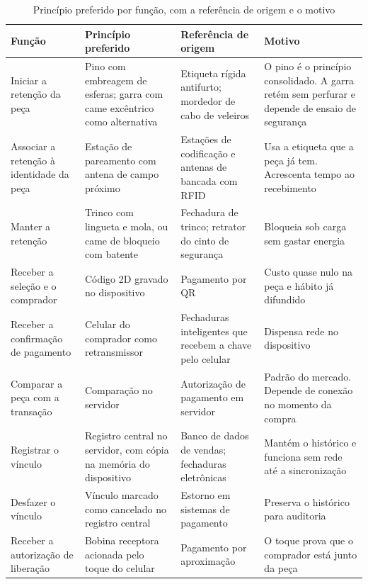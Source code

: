 \begin{table}[p]
    \centering
    \caption{Princípio preferido por função, com a referência de origem e o motivo}
    \label{tab:aprov_sintese}
    \scriptsize
    \setlength{\tabcolsep}{4pt}
    \renewcommand{\arraystretch}{1.25}
    \begin{tabularx}{\textwidth}{@{}
        >{\RaggedRight\arraybackslash}p{2.9cm}
        >{\RaggedRight\arraybackslash}p{3.6cm}
        >{\RaggedRight\arraybackslash}p{3.2cm}
        >{\RaggedRight\arraybackslash}X@{}}
        \toprule
        \textbf{Função} & \textbf{Princípio preferido} & \textbf{Referência de origem} & \textbf{Motivo} \\
        \midrule
        Iniciar a retenção da peça & Pino com embreagem de esferas; garra com came excêntrico como alternativa & Etiqueta rígida antifurto; mordedor de cabo de veleiros & O pino é o princípio consolidado. A garra retém sem perfurar e depende de ensaio de segurança \\
        Associar a retenção à identidade da peça & Estação de pareamento com antena de campo próximo & Estações de codificação e antenas de bancada com RFID & Usa a etiqueta que a peça já tem. Acrescenta tempo ao recebimento \\
        Manter a retenção & Trinco com lingueta e mola, ou came de bloqueio com batente & Fechadura de trinco; retrator do cinto de segurança & Bloqueia sob carga sem gastar energia \\
        Receber a seleção e o comprador & Código 2D gravado no dispositivo & Pagamento por QR & Custo quase nulo na peça e hábito já difundido \\
        Receber a confirmação de pagamento & Celular do comprador como retransmissor & Fechaduras inteligentes que recebem a chave pelo celular & Dispensa rede no dispositivo \\
        Comparar a peça com a transação & Comparação no servidor & Autorização de pagamento em servidor & Padrão do mercado. Depende de conexão no momento da compra \\
        Registrar o vínculo & Registro central no servidor, com cópia na memória do dispositivo & Banco de dados de vendas; fechaduras eletrônicas & Mantém o histórico e funciona sem rede até a sincronização \\
        Desfazer o vínculo & Vínculo marcado como cancelado no registro central & Estorno em sistemas de pagamento & Preserva o histórico para auditoria \\
        Receber a autorização de liberação & Bobina receptora acionada pelo toque do celular & Pagamento por aproximação & O toque prova que o comprador está junto da peça \\

\end{tabularx}
\end{table}
